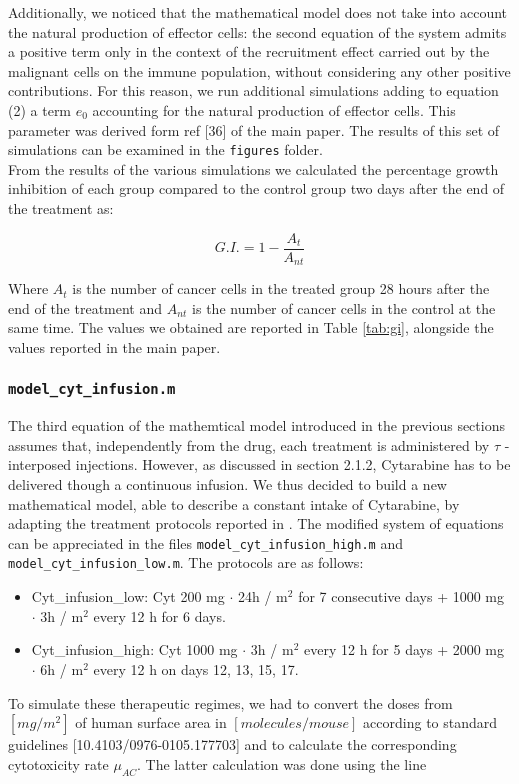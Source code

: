 Additionally, we noticed that the mathematical model does not take into account the natural production of effector cells: the second equation of the system admits a positive term only in the context of the recruitment effect carried out by the malignant cells on the immune population, without considering any other positive contributions. For this reason, we run additional simulations adding to equation (2) a term $e_0$ accounting for the natural production of effector cells. This parameter was derived form ref [36] of the main paper. The results of this set of simulations can be examined in the \texttt{figures} folder. \\
From the results of the various simulations we calculated the percentage growth inhibition of each group compared to the control group two days after the end of the treatment as:

$$ G.I. = 1 - \frac{A_t}{A_{nt}} $$ 

Where $A_t$ is the number of cancer cells in the treated group 28 hours after the end of the treatment and $A_{nt}$ is the number of cancer cells in the control at the same time. The values we obtained are reported in Table \ref{tab:gi}, alongside the values reported in the main paper. \\

\subsubsection{\texttt{model\_cyt\_infusion.m}}
The third equation of the mathemtical model introduced in the previous sections assumes that, independently from the drug, each treatment is administered by $\tau$ - interposed injections. However, as discussed in section 2.1.2, Cytarabine has to be delivered though a continuous infusion. We thus decided to build a new mathematical model, able to describe a constant intake of Cytarabine, by adapting the treatment protocols reported in \cite{cyt-3}. The modified system of equations can be appreciated in the files \texttt{model\_cyt\_infusion_high.m} and \texttt{model\_cyt\_infusion_low.m}. The protocols are as follows:
\begin{itemize}
	\item Cyt\_infusion\_low: Cyt 200 mg $\cdot$ 24h / m$^2$ for 7 consecutive days + 1000 mg $\cdot$ 3h / m$^2$ every 12 h for 6 days.
	\item Cyt\_infusion\_high: Cyt 1000 mg $\cdot$ 3h / m$^2$ every 12 h for 5 days + 2000 mg $\cdot$ 6h / m$^2$ every 12 h on days 12, 13, 15, 17.
\end{itemize}
To simulate these therapeutic regimes, we had to convert the doses from $[mg / m^2]$ of human surface area in $[molecules /mouse]$ according to standard guidelines [10.4103/0976-0105.177703] and to calculate the corresponding cytotoxicity rate $\mu_{AC}$. The latter calculation was done using the line 

